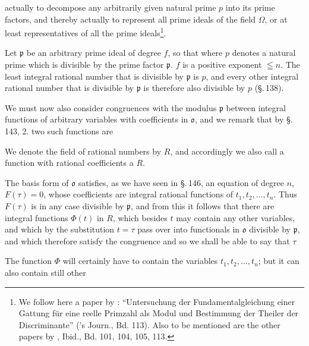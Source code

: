 actually to decompose any arbitrarily given natural prime $p$ into its
prime factors, and thereby actually to represent all prime ideals of
the field $\Omega$, or at least representatives of all the
prime ideals\footnote{We follow here a paper by : ``Untersuchung der
Fundamentalgleichung einer Gattung für eine reelle Primzahl als Modul
und Bestimmung der Theiler der Discriminante'' ('s Journ., Bd. 113).
Also to be mentioned are the other papers by , Ibid.,
Bd. 101, 104, 105, 113.}.

Let $\mathfrak p$ be an arbitrary prime ideal of degree $f$, so that
where $p$ denotes a natural prime which is divisible by the
prime factor $\mathfrak p$. $f$ is a positive exponent
$\leqq n$. The least integral rational number that is divisible by
$\mathfrak p$ is $p$, and every other integral rational number that is
divisible by $\mathfrak p$ is therefore also divisible by $p$
(\S.\,138).

We must now also consider congruences with the modulus $\mathfrak p$
between integral functions of arbitrary variables with coefficients in
$\mathfrak o$, and we remark that by \S.\,143, 2. two such functions
are 

We denote the field of rational numbers by $R$, and accordingly we
also call a function with rational coefficients a  $R$.

The basis form of $\mathfrak o$
satisfies, as we have seen in \S.\,146, an equation of degree
$n$, $F(\tau) = 0$, whose coefficients are integral
rational functions of $t_1, t_2, \ldots, t_n$. Thus $F(\tau)$ is in
any case divisible by $\mathfrak p$, and from this it follows that
there are integral functions $\Phi(t)$ in $R$, which besides $t$
may contain any other variables, and which by the substitution
$t = \tau$ pass over into functionals in $\mathfrak o$ divisible by
$\mathfrak p$, and which therefore satisfy the congruence
and so we shall be able to say that $\tau$ 

The function $\Phi$ will certainly have to contain the variables
$t_1, t_2, \ldots, t_n$; but it can also contain still other
